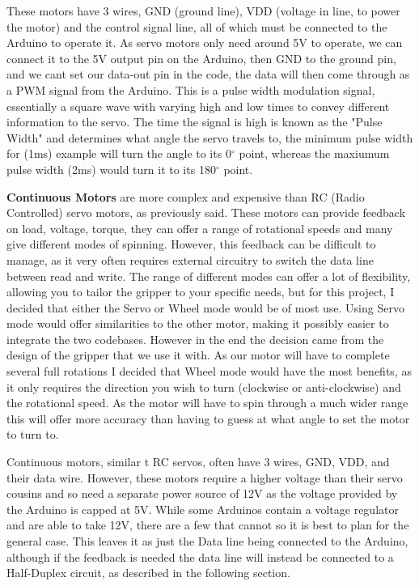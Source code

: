 \documentclass{l4proj}
\begin{document}
These motors have 3 wires, GND (ground line), VDD (voltage in line, to power the motor) and the control signal line, all of which must be connected to the Arduino to operate it. As servo motors only need around 5V to operate, we can connect it to the 5V output pin on the Arduino, then GND to the ground pin, and we cant set our data-out pin in the code, the data will then come through as a PWM signal from the Arduino. This is a pulse width modulation signal, essentially a square wave with varying high and low times to convey different information to the servo. The time the signal is high is known as the "Pulse Width" and determines what angle the servo travels to, the minimum pulse width for (1ms) example will turn the angle to its 0$^{\circ}$ point, whereas the maxiumum pulse width (2ms) would turn it to its 180$^{\circ}$ point. 

\textbf{Continuous Motors} are more complex and expensive than RC (Radio Controlled) servo motors, as previously said. These motors can provide feedback on load, voltage, torque, they can offer a range of rotational speeds and many give different modes of spinning. However, this feedback can be difficult to manage, as it very often requires external circuitry to switch the data line between read and write. The range of different modes can offer a lot of flexibility, allowing you to tailor the gripper to your specific needs, but for this project, I decided that either the Servo or Wheel mode would be of most use. Using Servo mode would offer similarities to the other motor, making it possibly easier to integrate the two codebases. However in the end the decision came from the design of the gripper that we use it with.  As our motor will have to complete several full rotations I decided that Wheel mode would have the most benefits, as it only requires the direction you wish to turn (clockwise or anti-clockwise) and the rotational speed. As the motor will have to spin through a much wider range this will offer more accuracy than having to guess at what angle to set the motor to turn to. 

Continuous motors, similar t RC servos, often have 3 wires, GND, VDD, and their data wire. However, these motors require a higher voltage than their servo cousins and so need a separate power source of 12V as the voltage provided by the Arduino is capped at 5V. While some Arduinos contain a voltage regulator and are able to take 12V, there are a few that cannot so it is best to plan for the general case. This leaves it as just the Data line being connected to the Arduino, although if the feedback is needed the data line will instead be connected to a Half-Duplex circuit, as described in the following section. 
\end{document}
